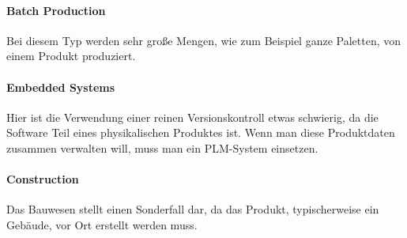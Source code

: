 \paragraph{Batch Production}
Bei diesem Typ werden sehr große Mengen, wie zum Beispiel ganze Paletten, von einem Produkt produziert.

\paragraph{Embedded Systems}
Hier ist die Verwendung einer reinen Versionskontroll etwas schwierig, da die Software Teil eines physikalischen Produktes ist. Wenn man diese Produktdaten zusammen verwalten will, muss man ein PLM-System einsetzen.

\paragraph{Construction}
Das Bauwesen stellt einen Sonderfall dar, da das Produkt, typischerweise ein Gebäude, vor Ort erstellt werden muss.
